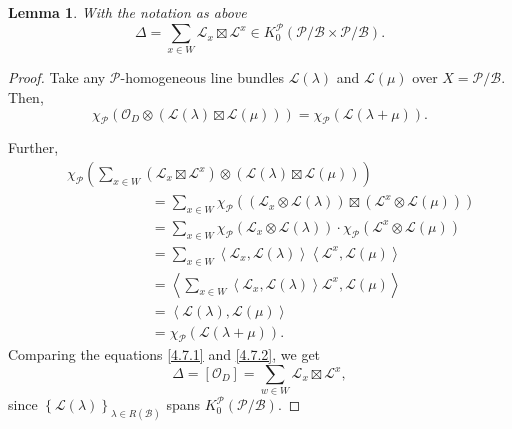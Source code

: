 \documentclass{article}
\newtheorem{lemma}[theorem]{Lemma}
\def\L{\mathcal{L}}
\def\P{\mathcal{P}}
\def\B{\mathcal{B}}
\begin{document}
\begin{lemma} \label{4.7}
With the notation as above
$$
\Delta =\sum_{x\in W}\L_x \boxtimes \L^x \in K_0^\P \left(\P/\B \times \P/\B\right). 
$$
\end{lemma}
\begin{proof}
Take any $\P$-homogeneous line bundles $\L\left(\lambda\right)$ and $\L\left(\mu\right)$ over $X=\P/\B$. Then, 
\begin{equation}\label{4.7.1}
\chi_{\P}\left(\mathcal{O}_D\otimes \left(\L\left(\lambda\right)\boxtimes \L\left(\mu\right)\right)\right) = \chi_\P \left(\L\left(\lambda+\mu\right)\right).
\end{equation}

Further, 
\begin{eqnarray}\label{4.7.2}
&&\chi_{\P}\left(\sum_{x\in W}\left(\L_x \boxtimes \L^x \right) \otimes \left(\L\left(\lambda\right)\boxtimes \L\left(\mu\right)\right)\right)\nonumber\\
&&\qquad\qquad\qquad=\sum_{x\in W}\chi_{\P}\left(\left(\L_x \otimes\L(\lambda)\right)\boxtimes \left(\L^x\otimes\L(\mu)\right)\right)\nonumber\\
&&\qquad\qquad\qquad=\sum_{x\in W}\chi_{\P}\left(\L_x \otimes\L(\lambda)\right) \cdot \chi_{\P} \left(\L^x\otimes\L(\mu)\right)\nonumber\\
&&\qquad\qquad\qquad=\sum_{x\in W}\left\langle \L_x ,\L(\lambda)\right\rangle\left\langle \L^x,\L(\mu)\right\rangle \nonumber\\
&&\qquad\qquad\qquad=\left\langle  \sum_{x\in W} \left\langle \L_x ,\L(\lambda)\right\rangle \L^x,\L(\mu)\right\rangle \nonumber\\
&&\qquad\qquad\qquad=\left\langle \L\left(\lambda\right),\L\left(\mu\right)\right\rangle\nonumber\\
&&\qquad\qquad\qquad=\chi_{\P}\left(\L(\lambda +\mu)\right).
\end{eqnarray}
Comparing the equations \eqref{4.7.1} and \eqref{4.7.2}, we get 
$$
\Delta =\left[\mathcal{O} _D\right] = \sum_{w\in W}\L_x \boxtimes \L^x,
$$
since $\left\{ \L\left(\lambda\right)\right\}_{\lambda \in R\left(\B\right)}$ spans $K_0^{\P}\left(\P/\B\right)$.
\end{proof}
\end{document}

